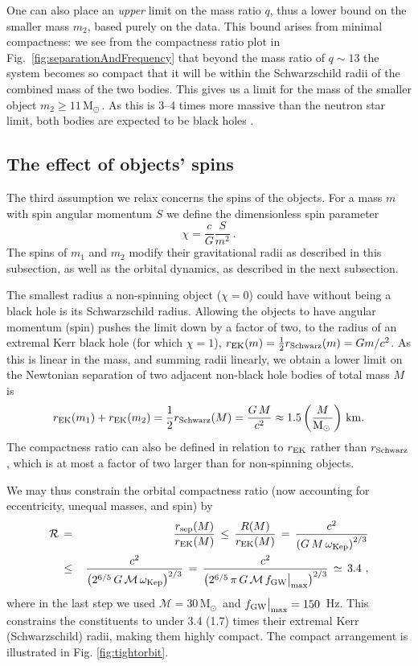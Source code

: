 \documentclass{andp2012}%
\def\w{\omega}
\def\({\left(}
\def\){\right)}
\def\be{\begin{equation}}
\def\ee{\end{equation}}
\def\bea{\begin{eqnarray}}
\def\eea{\end{eqnarray}}
\newcommand{\refigure}[1]{Fig.~\ref{#1}}
\newcommand{\caveatformat}[1]{\subsection{#1}}
\def\Mc{\mathcal{M}}
\def\submax{\big|_{\rm max}}
\def\fgwmax{f_{\rm GW} \submax}
\def\wkep{\w_{\rm Kep}}
\def\BH{black hole }		\def\BHs{black holes }			\def\BHns{black hole}		\def\BHsns{black holes}		\def\GW{gravitational wave }		\def\GWs{gravitational waves }				\def\GWns{gravitational wave}		\def\GWsns{gravitational waves}		\def\LR{light ring }		\def\ISCO{innermost stable circular orbit }		\def\NS{neutron star }		\def\NSs{neutron stars }		\def\GR{general relativity }
\newcommand{\Msun}{\ensuremath{\mathrm{M}_\odot\,}}
\newcommand{\CHIRPFSTRAINPEAK}{\ensuremath{150}} %
\newcommand{\CHIRPMASSAPPROX}{\ensuremath{30\, \Msun}}
\begin{document}
One can also place an {\it upper} limit on the mass ratio $q$,
thus a lower bound on the smaller mass $m_2$, based purely on the data. 
This bound arises from minimal compactness:
we see from the compactness ratio plot in \refigure{fig:separationAndFrequency} 
that beyond the mass ratio of $q\sim 13$ the system becomes so compact
that it will be within the Schwarzschild radii of the combined mass of the two bodies.
 This gives us a limit for the mass of the smaller object
$m_2 \geq 11 \, \Msun$.
As this is 3--4 times more massive than the \NS limit,
both bodies are expected to be \BHs.

\caveatformat{The effect of objects' spins}
\label{Sec:just:spins}
The third assumption we relax concerns the spins of the objects.
For a mass $m$ with spin angular momentum $S$ we define
the dimensionless spin parameter
\be
\chi = \frac{c}{G}\frac{S}{m^2}~.
\ee
The spins of $m_1$ and $m_2$ modify their gravitational radii 
as described in this subsection,
as well as the orbital dynamics, as described in the next subsection.

The smallest radius a non-spinning object ($\chi=0$)
could have without being a
\BH is its Schwarzschild radius.
Allowing the objects to have angular momentum (spin) pushes
the limit down by a factor of two, to the radius of an extremal Kerr
\BH (for which $\chi=1$), $r_{\rm EK}(m)=\frac{1}{2}r_{\rm Schwarz}(m)=Gm / c^2$.
As this is linear in the mass, and summing radii linearly,
we obtain a lower limit on the Newtonian separation of two adjacent non-\BH bodies of total mass $M$ is \be r_{\rm EK}
(m_1) + r_{\rm EK} (m_2)= \frac{1}{2} r_{\rm Schwarz}(M) = \frac{G \, M}{c^2}
\approx 1.5\(\frac{M}{\Msun}\)\,{\rm km}.
\label{rcompact}
\ee
The compactness ratio can also be defined in relation to $r_{\rm EK}$ rather than
$r_{\rm Schwarz}$, which is at most a factor of two larger than for non-spinning objects.

We may thus constrain the
orbital compactness ratio (now accounting for eccentricity, unequal masses, and spin) by
\bea \mathcal{R} \, &=& \,
\frac{r_{\rm sep}(M)}{r_{\rm EK}(M)} \, \leq \, \frac{R(M)}{r_{\rm EK}(M)} \, = \,
\frac{ c^2 } { \( G \, M \, \wkep \)^{2/3}} 	 \\
 &\leq& \, \frac{
  c^2 } { \( 2^{6/5} \, G \, \Mc \, \wkep \)^{2/3}} \, = \,
\frac{ c^2 } { \( 2^{6/5} \, \pi \, G \, \Mc \, \fgwmax \)^{2/3}} \,
\simeq \, 3.4 ~,	\nonumber
\label{compactness ratio}
\eea
where in the last step we used $\Mc=\CHIRPMASSAPPROX\!\!$ and $\fgwmax=\CHIRPFSTRAINPEAK$~Hz.
This constrains the constituents to under 3.4 (1.7) times their extremal Kerr (Schwarzschild) radii,
making them highly compact.
The compact arrangement is illustrated in Fig. \ref{fig:tightorbit}.
\end{document}
